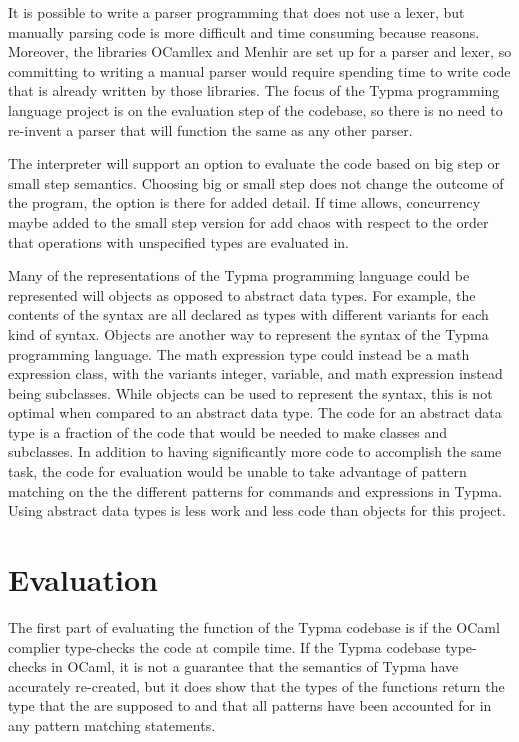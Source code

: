 \documentclass[10pt,twocolumn]{article}
\begin{document}
It is possible to write a parser programming that does not use a lexer, but manually parsing code is more difficult and time consuming because reasons. Moreover, the libraries OCamllex and Menhir are set up for a parser and lexer, so committing to writing a manual parser would require spending time to write code that is already written by those libraries. The focus of the Typma programming language project is on the evaluation step of the codebase, so there is no need to re-invent a parser that will function the same as any other parser.

The interpreter will support an option to evaluate the code based on big step or small step semantics. Choosing big or small step does not change the outcome of the program, the option is there for added detail. If time allows, concurrency maybe added to the small step version for add chaos with respect to the order that operations with unspecified types are evaluated in.

Many of the representations of the Typma programming language could be represented will objects as opposed to abstract data types. For example, the contents of the syntax are all declared as types with different variants for each kind of syntax. Objects are another way to represent the syntax of the Typma programming language. The math expression type could instead be a math expression class, with the variants integer, variable, and math expression instead being subclasses. While objects can be used to represent the syntax, this is not optimal when compared to an abstract data type. The code for an abstract data type is a fraction of the code that would be needed to make classes and subclasses. In addition to having significantly more code to accomplish the same task, the code for evaluation would be unable to take advantage of pattern matching on the the different patterns for commands and expressions in Typma. Using abstract data types is less work and less code than objects for this project.

\section{Evaluation} 

The first part of evaluating the function of the Typma codebase is if the OCaml complier type-checks the code at compile time. If the Typma codebase type-checks in OCaml, it is not a guarantee that the semantics of Typma have accurately re-created, but it does show that the types of the functions return the type that the are supposed to and that all patterns have been accounted for in any pattern matching statements.
\end{document}
